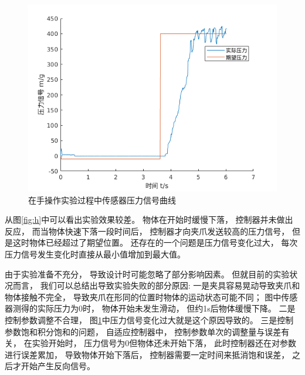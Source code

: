 \begin{figure}[!ht]
  \centering
  \includegraphics[width=12cm]{chapter04/pic/f}
  \caption{\label{fig:f}
    在手操作实验过程中传感器压力信号曲线}
  \vspace{-0.3cm}
\end{figure}


从图\ref{fig:h}中可以看出实验效果较差。
物体在开始时缓慢下落， 控制器并未做出反应， 而当物体快速下落一段时间后，
控制器才向夹爪发送较高的压力信号， 但是这时物体已经超过了期望位置。
还存在的一个问题是压力信号变化过大， 每次压力信号发生变化时直接从最小值增加到最大值。

由于实验准备不充分， 导致设计时可能忽略了部分影响因素。
但就目前的实验状况而言， 我们可以总结出导致实验失败的部分原因:
一是夹具容易晃动导致夹爪和物体接触不完全，
导致夹爪在形同的位置时物体的运动状态可能不同；
图中传感器测得的实际压力为0时， 物体开始未发生滑动， 但约1s后物体缓慢下降。
二是控制参数调整不合理， 图\ref{fig:f}中压力信号变化过大就是这个原因导致的。
三是控制参数饱和积分饱和的问题， 自适应控制器中， 控制参数单次的调整量与误差有关，
在实验开始时， 压力信号为0但物体还未开始下落， 此时控制器还在对参数进行误差累加，
导致物体开始下落后， 控制器需要一定时间来抵消饱和误差， 之后才开始产生反向信号。

